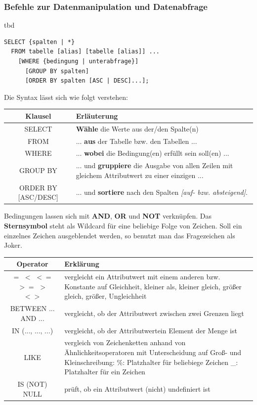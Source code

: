 \documentclass[a4paper,10pt,DIV9, BCOR12mm, oneside,openright,openbib]{scrreprt}
\theoremstyle{definition}
\theoremstyle{plain}
\begin{document}
\subsubsection{Befehle zur Datenmanipulation und Datenabfrage}      
tbd
\begin{lstlisting}[caption=Tabelle abfragen]
SELECT {spalten | *}
  FROM tabelle [alias] [tabelle [alias]] ...
    [WHERE {bedingung | unterabfrage}]
      [GROUP BY spalten]
      [ORDER BY spalten [ASC | DESC]...];
\end{lstlisting}
Die Syntax lässt sich wie folgt verstehen:
\begin{center}
\begin{tabularx}{\columnwidth}{|c|X|} \hline
\textbf{Klausel} & \textbf{Erläuterung}\\ \hline
SELECT & \textbf{Wähle} die Werte aus der/den Spalte(n)\\ \hline
FROM &  ... \textbf{aus} der Tabelle bzw. den Tabellen ...\\ \hline
WHERE & ... \textbf{wobei} die Bedingung(en) erfüllt sein soll(en) ...\\ \hline
GROUP BY & ... und \textbf{gruppiere} die Ausgabe von allen Zeilen mit gleichem Attributwert zu einer einzigen ...\\ \hline
ORDER BY [ASC/DESC] & ... und \textbf{sortiere} nach den Spalten \textit{[auf- bzw. absteigend]}. \\ \hline
\end{tabularx}
\end{center}
Bedingungen lassen sich mit \textbf{AND}, \textbf{OR} und \textbf{NOT} verknüpfen. Das \textbf{Sternsymbol} steht als Wildcard für eine beliebige Folge von Zeichen. Soll ein einzelnes Zeichen ausgeblendet werden, so benutzt man das Fragezeichen als Joker.
\begin{center}
\begin{tabularx}{\columnwidth}{|c|X|} \hline
\textbf{Operator} & \textbf{Erklärung}\\ \hline
$=$ $<$ $<=$ $>=$ $>$ $<>$ & vergleicht ein Attributwert mit einem anderen bzw. Konstante auf
Gleichheit, kleiner als, kleiner gleich, größer gleich, größer, Ungleichheit \\ \hline
BETWEEN ... AND ... &  vergleicht, ob der Attributwert zwischen zwei Grenzen liegt\\ \hline
IN (..., ..., ...) & vergleicht, ob der Attributwertein Element der Menge ist\\ \hline
LIKE & vergleich von Zeichenketten anhand von Ähnlichkeitsoperatoren mit Unterscheidung auf Groß- und Kleinschreibung: \newline
\%: Platzhalter für beliebiege Zeichen \newline
\_: Platzhalter für ein Zeichen\\ \hline
IS (NOT) NULL & prüft, ob ein Attributwert (nicht) undefiniert ist \\ \hline
\end{tabularx}
\end{center}
\end{document}
